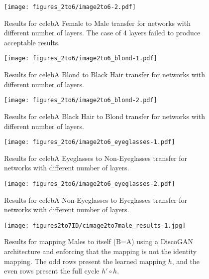 \documentclass{article} %
\begin{document}
 
\begin{figure}[t]
  \centering
  
 \texttt{[image: figures\_2to6/image2to6-2.pdf]}
  \caption{\label{fig:a002} Results for celebA Female to Male transfer for networks with different number of layers. The case of 4 layers failed to produce acceptable results.}
\end{figure}


\begin{figure}[t]
  \centering
  
 \texttt{[image: figures\_2to6/image2to6\_blond-1.pdf]}
  \caption{\label{fig:a003} Results for celebA Blond to Black Hair transfer for networks with different number of layers.}
\end{figure}

 
\begin{figure}[t]
  \centering
  
 \texttt{[image: figures\_2to6/image2to6\_blond-2.pdf]}
  \caption{\label{fig:a004} Results for celebA Black Hair to Blond transfer for networks with different number of layers.}
\end{figure}

\begin{figure}[t]
  \centering
  
 \texttt{[image: figures\_2to6/image2to6\_eyeglasses-1.pdf]}
  \caption{\label{fig:a005} Results for celebA Eyeglasses to Non-Eyeglasses transfer for networks with different number of layers.}
\end{figure}  

 
\begin{figure}[t]
  \centering
  
 \texttt{[image: figures\_2to6/image2to6\_eyeglasses-2.pdf]}
  \caption{\label{fig:a006} Results for celebA Non-Eyeglasses to Eyeglasses transfer for networks with different number of layers.}
\end{figure}


\begin{figure}[t]

  \centering

   

\texttt{[image: figures2to7ID/cimage2to7male\_results-1.jpg]}

  \caption{\label{fig:c003} Results for mapping Males to itself (B=A) using a DiscoGAN architecture and enforcing that the mapping is not the identity mapping. The odd rows present the learned mapping $h$, and the even rows present the full cycle $h'\circ h$.}
\end{figure}
\end{document}
